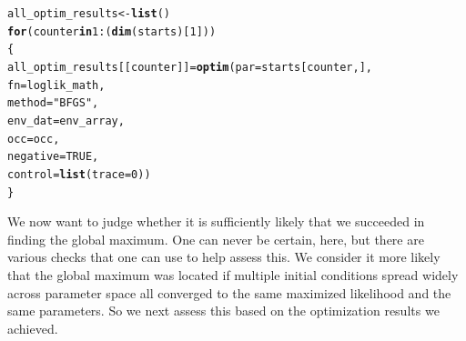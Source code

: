 \documentclass[11pt]{article}\usepackage[]{graphicx}\usepackage[]{xcolor}
\makeatletter
\newcommand{\hlnum}[1]{\textcolor[rgb]{0.686,0.059,0.569}{#1}}%
\newcommand{\hlsng}[1]{\textcolor[rgb]{0.192,0.494,0.8}{#1}}%
\newcommand{\hlopt}[1]{\textcolor[rgb]{0,0,0}{#1}}%
\newcommand{\hldef}[1]{\textcolor[rgb]{0.345,0.345,0.345}{#1}}%
\newcommand{\hlkwa}[1]{\textcolor[rgb]{0.161,0.373,0.58}{\textbf{#1}}}%
\newcommand{\hlkwb}[1]{\textcolor[rgb]{0.69,0.353,0.396}{#1}}%
\newcommand{\hlkwc}[1]{\textcolor[rgb]{0.333,0.667,0.333}{#1}}%
\newcommand{\hlkwd}[1]{\textcolor[rgb]{0.737,0.353,0.396}{\textbf{#1}}}%
\newenvironment{kframe}{%
 \def\at@end@of@kframe{}%
 \ifinner\ifhmode%
  \def\at@end@of@kframe{\end{minipage}}%
  \begin{minipage}{\columnwidth}%
 \fi\fi%
 \def\FrameCommand##1{\hskip\@totalleftmargin \hskip-\fboxsep
 \colorbox{shadecolor}{##1}\hskip-\fboxsep
     \hskip-\linewidth \hskip-\@totalleftmargin \hskip\columnwidth}%
 \MakeFramed {\advance\hsize-\width
   \@totalleftmargin\z@ \linewidth\hsize
   \@setminipage}}%
 {\par\unskip\endMakeFramed%
 \at@end@of@kframe}
\newenvironment{knitrout}{}{} %
\makeatother
\begin{document}
\begin{knitrout}
\color{fgcolor}\begin{kframe}
\begin{alltt}
\hldef{all_optim_results} \hlkwb{<-} \hlkwd{list}\hldef{()}
\hlkwa{for} \hldef{(counter} \hlkwa{in} \hlnum{1}\hlopt{:}\hldef{(}\hlkwd{dim}\hldef{(starts)[}\hlnum{1}\hldef{]))}
\hldef{\{}
  \hldef{all_optim_results [[counter]]} \hlkwb{=} \hlkwd{optim}\hldef{(}\hlkwc{par} \hldef{= starts[counter,],}
                                        \hlkwc{fn} \hldef{= loglik_math,}
                                        \hlkwc{method} \hldef{=} \hlsng{"BFGS"}\hldef{,}
                                        \hlkwc{env_dat} \hldef{= env_array,}
                                        \hlkwc{occ} \hldef{= occ,}
                                        \hlkwc{negative} \hldef{=} \hlnum{TRUE}\hldef{,}
                                        \hlkwc{control}\hldef{=}\hlkwd{list}\hldef{(}\hlkwc{trace}\hldef{=}\hlnum{0}\hldef{))}
\hldef{\}}
\end{alltt}
\end{kframe}
\end{knitrout}
\noindent We now want to judge whether it is sufficiently likely that we succeeded in finding the 
global maximum. One can never be certain, here, but there are various checks that one can use
to help assess this. We consider it more likely that the global maximum was located if
multiple initial conditions spread widely across parameter space all converged to the 
same maximized likelihood and the same parameters. So we next assess this based on
the optimization results we achieved. 
\end{document}
